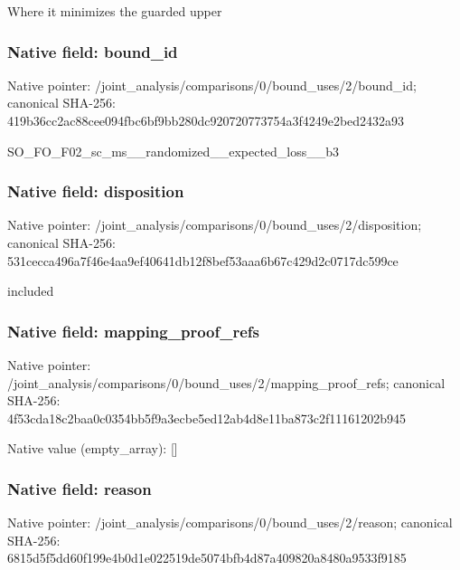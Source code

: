 \documentclass[10pt,a4paper]{article}
\begin{document}
\begingroup\raggedright\sloppy Where it minimizes the guarded upper\par\endgroup

\subsubsection{Native field: bound\_\allowbreak{}id}
Native pointer: /joint\_\allowbreak{}analysis/comparisons/0/bound\_\allowbreak{}uses/2/bound\_\allowbreak{}id; canonical SHA-256: 419b36cc2ac88cee094fbc6bf9bb280dc920720773754a3f4249e2bed2432a93

\begingroup\raggedright\sloppy SO\_\allowbreak{}FO\_\allowbreak{}F02\_\allowbreak{}sc\_\allowbreak{}ms\_\allowbreak{}\_\allowbreak{}randomized\_\allowbreak{}\_\allowbreak{}expected\_\allowbreak{}loss\_\allowbreak{}\_\allowbreak{}b3\par\endgroup

\subsubsection{Native field: disposition}
Native pointer: /joint\_\allowbreak{}analysis/comparisons/0/bound\_\allowbreak{}uses/2/disposition; canonical SHA-256: 531cecca496a7f46e4aa9ef40641db12f8bef53aaa6b67c429d2c0717dc599ce

\begingroup\raggedright\sloppy included\par\endgroup

\subsubsection{Native field: mapping\_\allowbreak{}proof\_\allowbreak{}refs}
Native pointer: /joint\_\allowbreak{}analysis/comparisons/0/bound\_\allowbreak{}uses/2/mapping\_\allowbreak{}proof\_\allowbreak{}refs; canonical SHA-256: 4f53cda18c2baa0c0354bb5f9a3ecbe5ed12ab4d8e11ba873c2f11161202b945

Native value (empty\_\allowbreak{}array): []

\subsubsection{Native field: reason}
Native pointer: /joint\_\allowbreak{}analysis/comparisons/0/bound\_\allowbreak{}uses/2/reason; canonical SHA-256: 6815d5f5dd60f199e4b0d1e022519de5074bfb4d87a409820a8480a9533f9185
\end{document}
